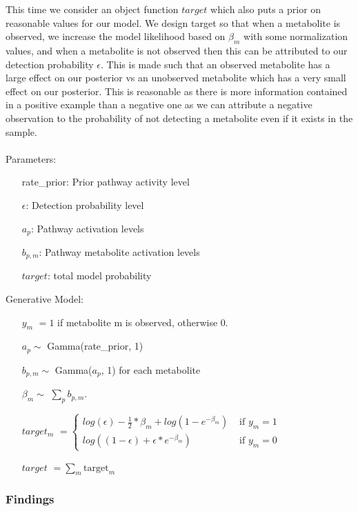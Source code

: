 \documentclass[11pt]{article}
\begin{document}
This time we consider an object function $target$ which also puts a prior on reasonable values for our model. We design target so that when a metabolite is observed, we increase the model likelihood based on $\beta_m$ with some normalization values, and when a metabolite is not observed then this can be attributed to our detection probability $\epsilon$. This is made such that an observed metabolite has a large effect on our posterior vs an unobserved metabolite which has a very small effect on our posterior. This is reasonable as there is more information contained in a positive example than a negative one as we can attribute a negative observation to the probability of not detecting a metabolite even if it exists in the sample. \\\\
Parameters:
\begin{itemize}
\item[rate\_prior:] Prior pathway activity level
\item[$\epsilon$:] Detection probability level
\item[$a_p$:] Pathway activation levels
\item[$b_{p,m}$:] Pathway metabolite activation levels
\item[$target$:] total model probability
\end{itemize}

Generative Model:
\begin{itemize}
\item [$y_m$] $= 1$ if metabolite m is observed, otherwise $0$.
\item [$a_p \sim$] Gamma(rate\_prior, 1)
\item [$b_{p,m} \sim$] Gamma($a_p$, 1) for each metabolite
\item [$\beta_m \sim$] $\sum_p b_{p,m}$.
\item [$target_m$] $ = \begin{cases}
 log(\epsilon) - \frac{1}{2} * \beta_m + log( 1 - e ^ { - \beta_m}) & \text{ if } y_m= 1 \\ 
 log((1 - \epsilon) + \epsilon * e ^ {-\beta_m}) & \text{ if } y_m = 0
\end{cases}$
\item[$target$] $ = \sum_m \text{target}_m$
\end{itemize}

\subsubsection{Findings}
\end{document}
